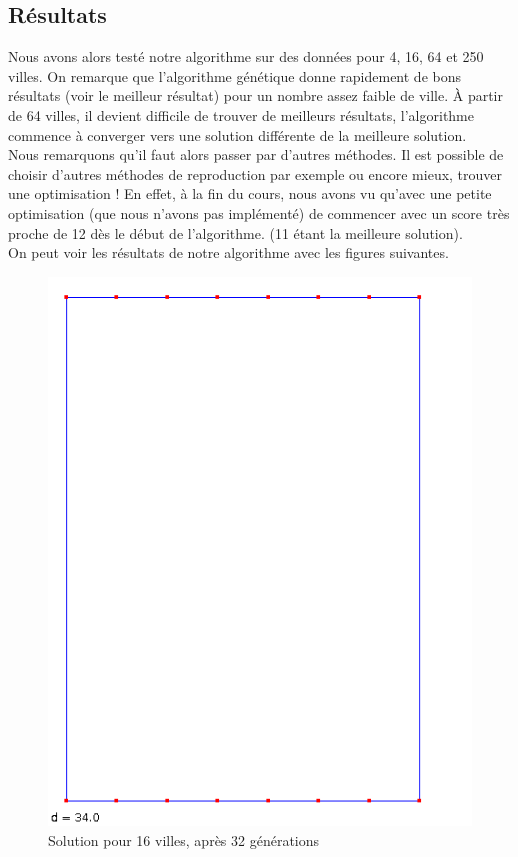 \documentclass{article}
\begin{document}
\subsection{Résultats}
Nous avons alors testé notre algorithme sur des données pour 4, 16, 64 et 250 villes. On remarque que l'algorithme génétique donne rapidement de bons résultats (voir le meilleur résultat) pour un nombre assez faible de ville. À partir de 64 villes, il devient difficile de trouver de meilleurs résultats, l'algorithme commence à converger vers une solution différente de la meilleure solution.\\
Nous remarquons qu'il faut alors passer par d'autres méthodes. Il est possible de choisir d'autres méthodes de reproduction par exemple ou encore mieux, trouver une optimisation ! En effet, à la fin du cours, nous avons vu qu'avec une petite optimisation (que nous n'avons pas implémenté) de commencer avec un score très proche de 12 dès le début de l'algorithme. (11 étant la meilleure solution).\\
On peut voir les résultats 	de notre algorithme avec les figures suivantes.\\
\begin{figure}
	\begin{center}
		\includegraphics[scale=0.7]{images/16-32gen}\\
		Solution pour 16 villes, après 32 générations
	\end{center}
\end{figure}
\end{document}
